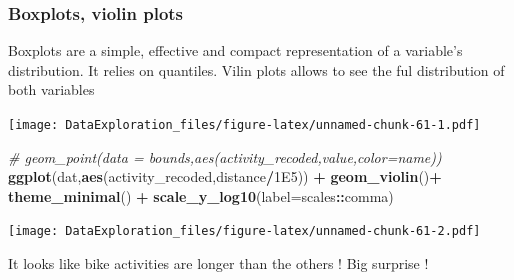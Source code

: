 \documentclass[
]{book}
\newenvironment{Shaded}{\begin{snugshade}}{\end{snugshade}}
\newcommand{\CommentTok}[1]{\textcolor[rgb]{0.56,0.35,0.01}{\textit{#1}}}
\newcommand{\DataTypeTok}[1]{\textcolor[rgb]{0.13,0.29,0.53}{#1}}
\newcommand{\FloatTok}[1]{\textcolor[rgb]{0.00,0.00,0.81}{#1}}
\newcommand{\KeywordTok}[1]{\textcolor[rgb]{0.13,0.29,0.53}{\textbf{#1}}}
\newcommand{\NormalTok}[1]{#1}
\newcommand{\OperatorTok}[1]{\textcolor[rgb]{0.81,0.36,0.00}{\textbf{#1}}}
\newcommand{\StringTok}[1]{\textcolor[rgb]{0.31,0.60,0.02}{#1}}
\begin{document}
\hypertarget{boxplots-violin-plots}{%
\subsubsection{Boxplots, violin plots}\label{boxplots-violin-plots}}

Boxplots are a simple, effective and compact representation of a variable's distribution. It relies on quantiles.
Vilin plots allows to see the ful distribution of both variables

\begin{Shaded}
\end{Shaded}

\texttt{[image: DataExploration\_files/figure-latex/unnamed-chunk-61-1.pdf]}

\begin{Shaded}
\begin{Highlighting}[]
  \CommentTok{# geom_point(data = bounds,aes(activity_recoded,value,color=name))}
\KeywordTok{ggplot}\NormalTok{(dat,}\KeywordTok{aes}\NormalTok{(activity_recoded,distance}\OperatorTok{/}\FloatTok{1E5}\NormalTok{)) }\OperatorTok{+}\StringTok{ }\KeywordTok{geom_violin}\NormalTok{()}\OperatorTok{+}\StringTok{ }\KeywordTok{theme_minimal}\NormalTok{() }\OperatorTok{+}\StringTok{ }\KeywordTok{scale_y_log10}\NormalTok{(}\DataTypeTok{label=}\NormalTok{scales}\OperatorTok{::}\NormalTok{comma)}
\end{Highlighting}
\end{Shaded}

\texttt{[image: DataExploration\_files/figure-latex/unnamed-chunk-61-2.pdf]}

It looks like bike activities are longer than the others ! Big surprise !
\end{document}
